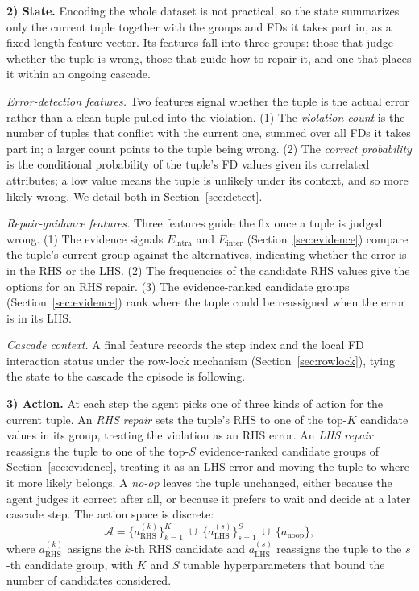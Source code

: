 \documentclass[sigconf]{acmart}
\begin{document}
\noindent\textbf{2) State.}
Encoding the whole dataset is not practical, so the state summarizes only the current tuple together with the groups and FDs it takes part in, as a fixed-length feature vector. Its features fall into three groups: those that judge whether the tuple is wrong, those that guide how to repair it, and one that places it within an ongoing cascade.

\emph{Error-detection features.} Two features signal whether the tuple is the actual error rather than a clean tuple pulled into the violation. (1) The \emph{violation count} is the number of tuples that conflict with the current one, summed over all FDs it takes part in; a larger count points to the tuple being wrong. (2) The \emph{correct probability} is the conditional probability of the tuple's FD values given its correlated attributes; a low value means the tuple is unlikely under its context, and so more likely wrong. We detail both in Section~\ref{sec:detect}.

\emph{Repair-guidance features.} Three features guide the fix once a tuple is judged wrong. (1) The evidence signals $E_{\text{intra}}$ and $E_{\text{inter}}$ (Section~\ref{sec:evidence}) compare the tuple's current group against the alternatives, indicating whether the error is in the RHS or the LHS. (2) The frequencies of the candidate RHS values give the options for an RHS repair. (3) The evidence-ranked candidate groups (Section~\ref{sec:evidence}) rank where the tuple could be reassigned when the error is in its LHS.

\emph{Cascade context.} A final feature records the step index and the local FD interaction status under the row-lock mechanism (Section~\ref{sec:rowlock}), tying the state to the cascade the episode is following.

\noindent\textbf{3) Action.}
At each step the agent picks one of three kinds of action for the current tuple. An \emph{RHS repair} sets the tuple's RHS to one of the top-$K$ candidate values in its group, treating the violation as an RHS error. An \emph{LHS repair} reassigns the tuple to one of the top-$S$ evidence-ranked candidate groups of Section~\ref{sec:evidence}, treating it as an LHS error and moving the tuple to where it more likely belongs. A \emph{no-op} leaves the tuple unchanged, either because the agent judges it correct after all, or because it prefers to wait and decide at a later cascade step. The action space is discrete:
\[
\mathcal{A} = \{a_{\text{RHS}}^{(k)}\}_{k=1}^{K} \;\cup\; \{a_{\text{LHS}}^{(s)}\}_{s=1}^{S} \;\cup\; \{a_{\text{noop}}\},
\]
where $a_{\text{RHS}}^{(k)}$ assigns the $k$-th RHS candidate and $a_{\text{LHS}}^{(s)}$ reassigns the tuple to the $s$-th candidate group, with $K$ and $S$ tunable hyperparameters that bound the number of candidates considered.
\end{document}
